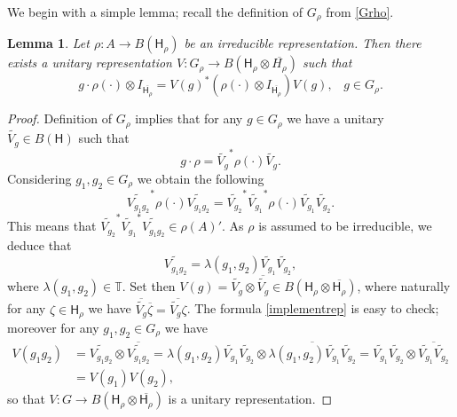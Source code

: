 \documentclass[11 pt, leqno, hidelinks]{amsart}%
\theoremstyle{plain}
\newtheorem{lemma}[theorem]{Lemma}
\numberwithin{equation}{section}
\newcommand{\Hil}{\mathsf{H}}
\begin{document}
We begin with a simple lemma; recall the definition of $G_\rho$ from \eqref{Grho}.

\begin{lemma}\label{lem:implement}
	Let $\rho:A \to B(\Hil_\rho)$ be an irreducible representation. Then there exists a unitary representation $V:G_\rho \to B(\Hil_\rho \otimes \overline{H_\rho})$ such that
	\begin{equation} g \cdot \rho(\cdot) \otimes I_{\overline{\Hil_\rho}} = V(g)^* (\rho(\cdot) \otimes I_{\overline{\Hil_\rho}}) V(g), \;\;\; g \in G_\rho. \label{implementrep}\end{equation}
\end{lemma}

\begin{proof}
	Definition of $G_\rho$ implies that for any $g \in G_\rho$ we have a unitary $\widetilde{V_g} \in B(\Hil)$ such that
	\[ g \cdot \rho = \widetilde{V_g}^*\rho(\cdot) \widetilde{V_g}.\]
	Considering $g_1, g_2 \in G_\rho$ we obtain the following  	
	\[ \widetilde{V_{g_1g_2}}^*\rho(\cdot) \widetilde{V_{g_1g_2}} =   \widetilde{V_{g_2}}^* \widetilde{V_{g_1}}^* \rho(\cdot) \widetilde{V_{g_1}} \widetilde{V_{g_2}}. \]
	This means that  $\widetilde{V_{g_2}}^* \widetilde{V_{g_1}}^* \widetilde{V_{g_1g_2}} \in \rho(A)'$. As $\rho$ is  assumed to be irreducible, we deduce that
	\[ \widetilde{V_{g_1g_2}} = \lambda(g_1, g_2) \widetilde{V_{g_1}} \widetilde{V_{g_2}},\]	
	where $\lambda(g_1, g_2) \in \mathbb{T}$.
	Set then $V(g) = \widetilde{V_g} \otimes \overline{\widetilde{V_g}} \in B(\Hil_\rho \otimes\overline{ \Hil_\rho})$, where naturally for any $\zeta \in \Hil_\rho$ we have $\overline{\widetilde{V_g}} \overline{\zeta} = \overline{\widetilde{V_g} \zeta}$. The formula \eqref{implementrep} is easy to check; moreover for any $g_1, g_2 \in G_\rho$ we have
	\begin{align*} V(g_1 g_2) &= \widetilde{V_{g_1 g_2}} \otimes \overline{\widetilde{V_{g_1 g_2}}} =
		\lambda(g_1, g_2) \widetilde{V_{g_1}} \widetilde{V_{g_2}} \otimes \overline{\lambda(g_1, g_2) \widetilde{V_{g_1}} \widetilde{V_{g_2}}} =  \widetilde{V_{g_1}} \widetilde{V_{g_2}} \otimes \overline{ \widetilde{V_{g_1}} \widetilde{V_{g_2}}} \\&= V(g_1)V(g_2),	
	\end{align*}	
	so that $V:G \to B(\Hil_\rho \otimes\overline{ \Hil_\rho})$ is a unitary representation.
\end{proof}
\end{document}
